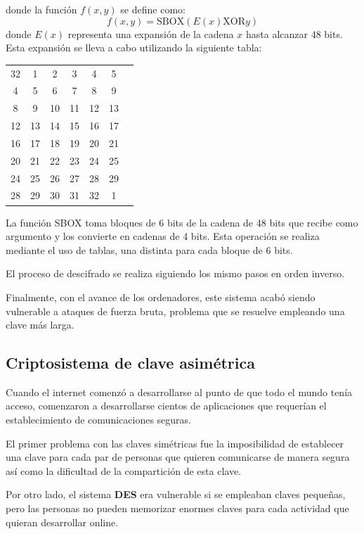 \documentclass[nochap]{apuntesURJC}
\begin{document}
\begin{enumerate}
donde la función $f(x,y)$ se define como:
\[f(x,y) = \text{SBOX}(E(x) \text{XOR} y)\]
donde $E(x)$ representa una expansión de la cadena $x$ hasta alcanzar 48 bits. Esta expansión se lleva a cabo utilizando la siguiente tabla:
\begin{center}
\begin{tabular}{ccccccc}
32 &  1 &   2 &   3 &   4 &   5\\
4  & 5  &  6  &  7  &  8  &  9\\
8  & 9  & 10  & 11  & 12  & 13\\
12 & 13 &  14 &  15 &  16 &  17\\
16 & 17 &  18 &  19 &  20 &  21\\
20 & 21 &  22 &  23 &  24 &  25\\
24 & 25 &  26 &  27 &  28 &  29\\
28 & 29 &  30 &  31 &  32 &   1
\end{tabular}
\end{center}

La función SBOX toma bloques de 6 bits de la cadena de 48 bits que recibe como argumento y los convierte en cadenas de 4 bits. Esta operación se realiza mediante el uso de tablas, una distinta para cada bloque de 6 bits.


\end{enumerate}

El proceso de descifrado se realiza siguiendo los mismo pasos en orden inverso.

Finalmente, con el avance de los ordenadores, este sistema acabó siendo vulnerable a ataques de fuerza bruta, problema que se resuelve empleando una clave más larga.

\subsection{Criptosistema de clave asimétrica}
Cuando el internet comenzó a desarrollarse al punto de que todo el mundo tenía acceso, comenzaron a desarrollarse cientos de aplicaciones que requerían el establecimiento de comunicaciones seguras.

El primer problema con las claves simétricas fue la imposibilidad de establecer una clave para cada par de personas que quieren comunicarse de manera segura así como la dificultad de la compartición de esta clave.

Por otro lado, el sistema \textbf{DES} era vulnerable si se empleaban claves pequeñas, pero las personas no pueden memorizar enormes claves para cada actividad que quieran desarrollar online.
\end{document}
